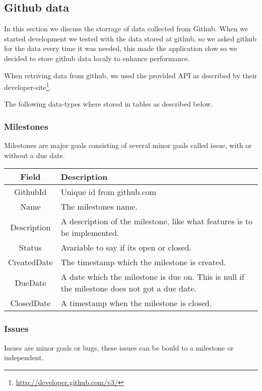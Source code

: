 \subsection{Github data}
In this section we discuss the storrage of data collected from Github. When we started development we tested with the data stored at github, so we asked github for the data every time it was needed, this made the application slow so we decided to store github data localy to enhance performance. 

When retriving data from github, we used the provided API as described by their developer-site\footnote{\url{http://developer.github.com/v3/}}.

The following data-types where stored in tables as described below.

\subsubsection*{Milestones}
Milestones are major goals consisting of several minor goals called issue, with or without a due date. \\

\vspace{0.5cm}
\begin{tabularx}{\linewidth}{| c | X |}
    \hline
    \rowcolor[gray]{0.8}
    \textbf{Field} & \textbf{Description} \\
    \hline
    GithubId & Unique id from github.com\\ \hline
    Name & The milestones name.\\ \hline
   	Description & A description of the milestone, like what features is to be implemented.\\ \hline
    Status & Avariable to say if its open or closed.\\ \hline
    CreatedDate & The timestamp which the milestone is created.\\ \hline
    DueDate & A date which the milestone is due on. This is null if the milestone does not got a due date.\\ \hline
    ClosedDate & A timestamp when the milestone is closed.\\ 
    \hline
\end{tabularx}
\vspace{0.5cm}

\subsubsection*{Issues}
Issues are minor goals or bugs, these issues can be bould to a milestone or independent. \\

